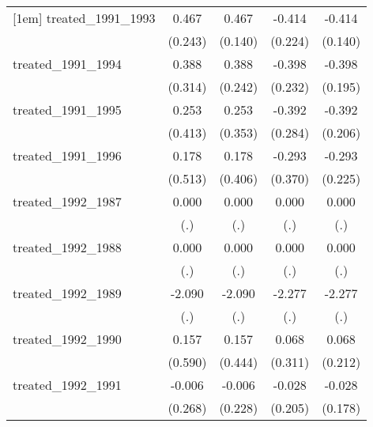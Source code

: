 {\begin{tabular}{l*{4}{c}}
[1em]
treated\_1991\_1993&       0.467         &       0.467\sym{***}&      -0.414         &      -0.414\sym{**} \\
            &     (0.243)         &     (0.140)         &     (0.224)         &     (0.140)         \\
[1em]
treated\_1991\_1994&       0.388         &       0.388         &      -0.398         &      -0.398\sym{*}  \\
            &     (0.314)         &     (0.242)         &     (0.232)         &     (0.195)         \\
[1em]
treated\_1991\_1995&       0.253         &       0.253         &      -0.392         &      -0.392         \\
            &     (0.413)         &     (0.353)         &     (0.284)         &     (0.206)         \\
[1em]
treated\_1991\_1996&       0.178         &       0.178         &      -0.293         &      -0.293         \\
            &     (0.513)         &     (0.406)         &     (0.370)         &     (0.225)         \\
[1em]
treated\_1992\_1987&       0.000         &       0.000         &       0.000         &       0.000         \\
            &         (.)         &         (.)         &         (.)         &         (.)         \\
[1em]
treated\_1992\_1988&       0.000         &       0.000         &       0.000         &       0.000         \\
            &         (.)         &         (.)         &         (.)         &         (.)         \\
[1em]
treated\_1992\_1989&      -2.090         &      -2.090         &      -2.277         &      -2.277         \\
            &         (.)         &         (.)         &         (.)         &         (.)         \\
[1em]
treated\_1992\_1990&       0.157         &       0.157         &       0.068         &       0.068         \\
            &     (0.590)         &     (0.444)         &     (0.311)         &     (0.212)         \\
[1em]
treated\_1992\_1991&      -0.006         &      -0.006         &      -0.028         &      -0.028         \\
            &     (0.268)         &     (0.228)         &     (0.205)         &     (0.178)         \\

\end{tabular}}

